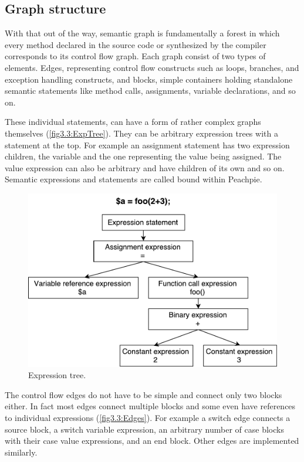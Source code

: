 \subsection{Graph structure}

With that out of the way, semantic graph is fundamentally a forest in which every method declared in the source code or synthesized by the compiler corresponds to its control flow graph. Each graph consist of two types of elements. Edges, representing control flow constructs such as loops, branches, and exception handling constructs, and blocks, simple containers holding standalone semantic statements like method calls, assignments, variable declarations, and so on. 

These individual statements, can have a form of rather complex graphs themselves (\autoref{fig3.3:ExpTree}). They can be arbitrary expression trees with a statement at the top. For example an assignment statement has two expression children, the variable and the one representing the value being assigned. The value expression can also be arbitrary and have children of its own and so on. Semantic expressions and statements are called bound within Peachpie.

\begin{figure}[h]
	\centering	
	\includegraphics[scale=0.75]{../img/3_3_exprstatements}	
	\caption{Expression tree.}
	\label{fig3.3:ExpTree}
\end{figure}

The control flow edges do not have to be simple and connect only two blocks either. In fact most edges connect multiple blocks and some even have references to individual expressions (\autoref{fig3.3:Edges}). For example a switch edge connects a source block, a switch variable expression, an arbitrary number of case blocks with their case value expressions, and an end block. Other edges are implemented similarly.

